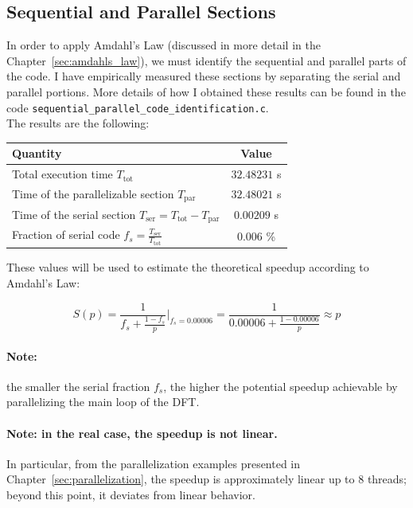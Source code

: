 \subsection{Sequential and Parallel Sections}
In order to apply Amdahl's Law (discussed in more detail in the Chapter~\ref{sec:amdahls_law}), we must identify the sequential and parallel parts of the code. 
I have empirically measured these sections by separating the serial and parallel portions.
More details of how I obtained these results can be found in the code \texttt{sequential\_parallel\_code\_identification.c}.\\

\noindent
The results are the following:

\begin{table}[h!]
\centering
\begin{tabular}{l c}
\hline
\textbf{Quantity} & \textbf{Value} \\
\hline
Total execution time $T_\text{tot}$ & $\text{32.48231}$ s \\
Time of the parallelizable section $T_\text{par}$ & $\text{32.48021}$ s \\
Time of the serial section $T_\text{ser} = T_\text{tot} - T_\text{par}$ & $\text{0.00209}$ s \\
Fraction of serial code $f_s = \frac{T_\text{ser}}{T_\text{tot}}$ & $\text{0.006}$ \% \\
\hline
\end{tabular}
\label{tab:seq_par_times}
\end{table}

\noindent
These values will be used to estimate the theoretical speedup according to Amdahl's Law:

\[
S(p) = \frac{1}{f_s + \frac{1-f_s}{p}} \Big|_{f_s=0.00006} =  \frac{1}{0.00006 + \frac{1-0.00006}{p}} \approx p
\]

\paragraph{Note:} the smaller the serial fraction $f_s$, the higher the potential speedup achievable by parallelizing the main loop of the DFT.

\paragraph{Note: in the real case, the speedup is not linear.}
In particular, from the parallelization examples presented in Chapter~\ref{sec:parallelization}, the speedup is approximately linear up to 8 threads; beyond this point, it deviates from linear behavior.

